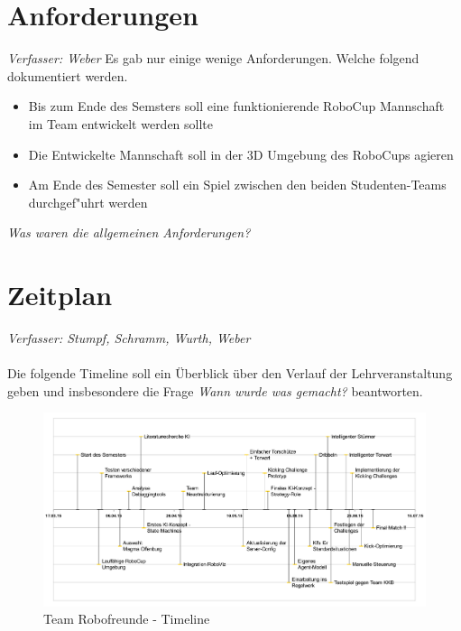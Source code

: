 \documentclass[fontsize=12pt,a4paper,final]{scrartcl}[2003/01/01]
\begin{document}
\section{Anforderungen}
\textit{Verfasser: Weber}
Es gab nur einige wenige Anforderungen. Welche folgend dokumentiert werden.

\begin{itemize}
\item Bis zum Ende des Semsters soll eine funktionierende RoboCup Mannschaft im Team entwickelt werden sollte
\item Die Entwickelte Mannschaft soll in der 3D Umgebung des RoboCups agieren
\item Am Ende des Semester soll ein Spiel zwischen den beiden Studenten-Teams durchgef"uhrt werden
\end{itemize}

\textit{Was waren die allgemeinen Anforderungen?}
\section{Zeitplan}
\textit{Verfasser: Stumpf, Schramm, Wurth, Weber}\\
\\
Die folgende Timeline soll ein Überblick über den Verlauf der Lehrveranstaltung geben und insbesondere die Frage \textit{\glqq Wann wurde was gemacht?\grqq} beantworten.

\begin{figure}[H]
	\centering
	\includegraphics[width=\textwidth]{Grafiken/Timeline_cropped}
	\caption{Team Robofreunde - Timeline}
	\label{fig:Timeline}
\end{figure}
\end{document}
